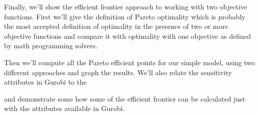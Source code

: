 \documentclass[12pt]{article}
\begin{document}
Finally, we'll show the efficient frontier approach to working with 
two objective functions.  First we'll give the definition of Pareto 
optimality which is probably the most accepted
definition of optimality in the presence of two or more objective
functions and compare it with optimality with one objective
as defined by math programming solvers.

Then we'll compute all the Pareto efficient points for our simple
model, using two different approaches and graph the results.
We'll also relate the sensitivity attributes in Gurobi to the 

and demonstrate some how some of the efficient frontier
can be calculated just with the attributes available in Gurobi.
\end{document}
